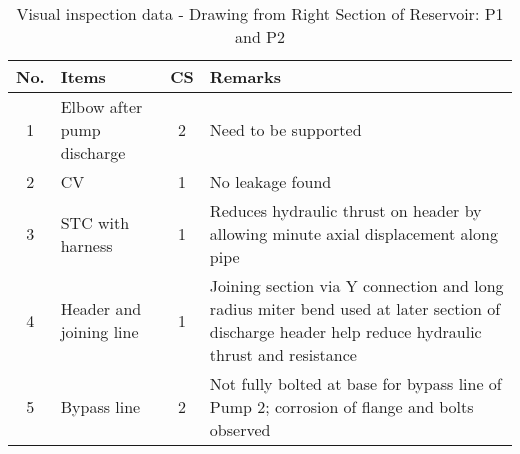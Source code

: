 \begin{table}[!htb]
	\caption{Visual inspection data - Drawing from Right Section of Reservoir: P1 and P2}
	\label{ch043_tbl_visualinspectionP1P2}
		{\scriptsize
\begin{tabular}{c|l|c|p{9cm}}

\hline
No. & Items & CS & Remarks \\ 
\hline
1 & Elbow after pump discharge & 2 & Need to be supported  \\ 
2 & CV & 1 & No leakage found \\ 
3 & STC with harness & 1 & Reduces hydraulic thrust on header by allowing minute axial displacement along pipe \\ 
4 & Header and joining line & 1 & Joining section via Y connection and long radius miter bend used at later section of discharge header help reduce hydraulic thrust and resistance \\ 
5 & Bypass line & 2 & Not fully bolted at base for bypass line of Pump 2; corrosion of flange and bolts observed \\ 
\hline

\end{tabular}
	}
\end{table}